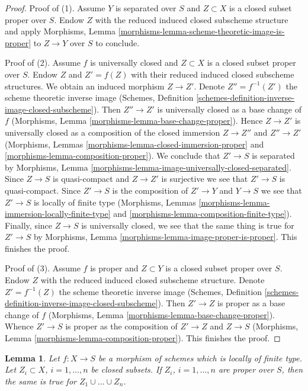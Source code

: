 \documentclass[10pt,a4paper]{amsart}
\theoremstyle{plain}
\newtheorem{lemma}[subsection]{Lemma}
\theoremstyle{definition}
\theoremstyle{remark}
\numberwithin{equation}{subsection}
\begin{document}
\begin{proof}
Proof of (1). Assume $Y$ is separated over $S$ and $Z \subset X$
is a closed subset proper over $S$. Endow $Z$ with the reduced induced
closed subscheme structure and apply
Morphisms, Lemma \ref{morphisms-lemma-scheme-theoretic-image-is-proper}
to $Z \to Y$ over $S$ to conclude.

\medskip\noindent
Proof of (2). Assume $f$ is universally closed and $Z \subset X$ is a
closed subset proper over $S$. Endow $Z$ and $Z' = f(Z)$ with their reduced
induced closed subscheme structures. We obtain an induced
morphism $Z \to Z'$.
Denote $Z'' = f^{-1}(Z')$ the scheme theoretic inverse image
(Schemes, Definition \ref{schemes-definition-inverse-image-closed-subscheme}).
Then $Z'' \to Z'$ is universally closed as a base change of $f$
(Morphisms, Lemma \ref{morphisms-lemma-base-change-proper}).
Hence $Z \to Z'$ is universally closed as a composition of
the closed immersion $Z \to Z''$ and $Z'' \to Z'$
(Morphisms, Lemmas
\ref{morphisms-lemma-closed-immersion-proper} and
\ref{morphisms-lemma-composition-proper}).
We conclude that $Z' \to S$ is separated by
Morphisms, Lemma \ref{morphisms-lemma-image-universally-closed-separated}.
Since $Z \to S$ is quasi-compact and $Z \to Z'$ is surjective
we see that $Z' \to S$ is quasi-compact.
Since $Z' \to S$ is the composition of $Z' \to Y$ and $Y \to S$
we see that $Z' \to S$ is locally of finite type
(Morphisms, Lemmas \ref{morphisms-lemma-immersion-locally-finite-type} and
\ref{morphisms-lemma-composition-finite-type}).
Finally, since $Z \to S$ is universally closed, we see that
the same thing is true for $Z' \to S$ by
Morphisms, Lemma \ref{morphisms-lemma-image-proper-is-proper}.
This finishes the proof.

\medskip\noindent
Proof of (3). Assume $f$ is proper and $Z \subset Y$ is a closed subset
proper over $S$. Endow $Z$ with the reduced induced closed subscheme
structure. Denote $Z' = f^{-1}(Z)$ the scheme theoretic inverse image
(Schemes, Definition \ref{schemes-definition-inverse-image-closed-subscheme}).
Then $Z' \to Z$ is proper as a base change of $f$
(Morphisms, Lemma \ref{morphisms-lemma-base-change-proper}).
Whence $Z' \to S$ is proper as the composition of $Z' \to Z$
and $Z \to S$
(Morphisms, Lemma \ref{morphisms-lemma-composition-proper}).
This finishes the proof.
\end{proof}

\begin{lemma}
\label{lemma-union-closed-proper-over-base}
Let $f : X \to S$ be a morphism of schemes which is locally of finite type.
Let $Z_i \subset X$, $i = 1, \ldots, n$ be closed subsets.
If $Z_i$, $i = 1, \ldots, n$ are proper over $S$, then the same is
true for $Z_1 \cup \ldots \cup Z_n$.
\end{lemma}
\end{document}
